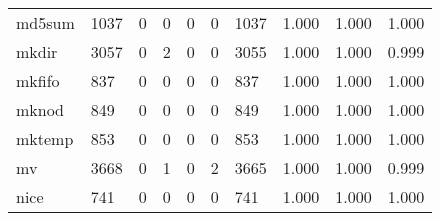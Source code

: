 \begin{longtable}{lp{1.3cm}p{1.3cm}p{1.3cm}p{1.3cm}p{1.3cm}p{1.3cm}p{1.3cm}p{1.3cm}p{1.3cm}}
md5sum    &                   1037 &                                  0 &                                 0 &                                0 &                                 0 &                            1037 &                                1.000 &                                  1.000 &                                1.000 \\
mkdir     &                   3057 &                                  0 &                                 2 &                                0 &                                 0 &                            3055 &                                1.000 &                                  1.000 &                                0.999 \\
mkfifo    &                    837 &                                  0 &                                 0 &                                0 &                                 0 &                             837 &                                1.000 &                                  1.000 &                                1.000 \\
mknod     &                    849 &                                  0 &                                 0 &                                0 &                                 0 &                             849 &                                1.000 &                                  1.000 &                                1.000 \\
mktemp    &                    853 &                                  0 &                                 0 &                                0 &                                 0 &                             853 &                                1.000 &                                  1.000 &                                1.000 \\
mv        &                   3668 &                                  0 &                                 1 &                                0 &                                 2 &                            3665 &                                1.000 &                                  1.000 &                                0.999 \\
nice      &                    741 &                                  0 &                                 0 &                                0 &                                 0 &                             741 &                                1.000 &                                  1.000 &                                1.000 \\

\end{longtable}
